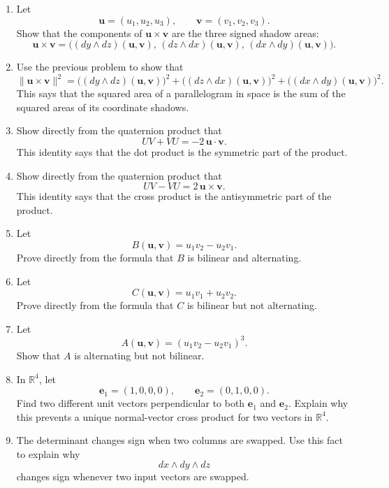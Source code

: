 \begin{enumerate}
\item Let
\[
    \mathbf u=(u_1,u_2,u_3),
    \qquad
    \mathbf v=(v_1,v_2,v_3).
\]
Show that the components of \(\mathbf u\times\mathbf v\) are the three signed shadow
areas:
\[
\mathbf u\times\mathbf v
=
\bigl(
(dy\wedge dz)(\mathbf u,\mathbf v),\,
(dz\wedge dx)(\mathbf u,\mathbf v),\,
(dx\wedge dy)(\mathbf u,\mathbf v)
\bigr).
\]

\item Use the previous problem to show that
\[
\|\mathbf u\times\mathbf v\|^2
=
\bigl((dy\wedge dz)(\mathbf u,\mathbf v)\bigr)^2
+
\bigl((dz\wedge dx)(\mathbf u,\mathbf v)\bigr)^2
+
\bigl((dx\wedge dy)(\mathbf u,\mathbf v)\bigr)^2.
\]
This says that the squared area of a parallelogram in space is the sum of the squared
areas of its coordinate shadows.

\item Show directly from the quaternion product that
\[
    UV+VU=-2\,\mathbf u\cdot\mathbf v.
\]
This identity says that the dot product is the symmetric part of the product.

\item Show directly from the quaternion product that
\[
    UV-VU=2\,\mathbf u\times\mathbf v.
\]
This identity says that the cross product is the antisymmetric part of the product.

\item Let
\[
    B(\mathbf u,\mathbf v)=u_1v_2-u_2v_1.
\]
Prove directly from the formula that \(B\) is bilinear and alternating.

\item Let
\[
    C(\mathbf u,\mathbf v)=u_1v_1+u_2v_2.
\]
Prove directly from the formula that \(C\) is bilinear but not alternating.

\item Let
\[
    A(\mathbf u,\mathbf v)=(u_1v_2-u_2v_1)^3.
\]
Show that \(A\) is alternating but not bilinear.

\item In \(\mathbb R^4\), let
\[
    \mathbf e_1=(1,0,0,0),
    \qquad
    \mathbf e_2=(0,1,0,0).
\]
Find two different unit vectors perpendicular to both \(\mathbf e_1\) and
\(\mathbf e_2\).  Explain why this prevents a unique normal-vector cross product for
two vectors in \(\mathbb R^4\).

\item The determinant changes sign when two columns are swapped.  Use this fact to
explain why
\[
    dx\wedge dy\wedge dz
\]
changes sign whenever two input vectors are swapped.


\end{enumerate}
